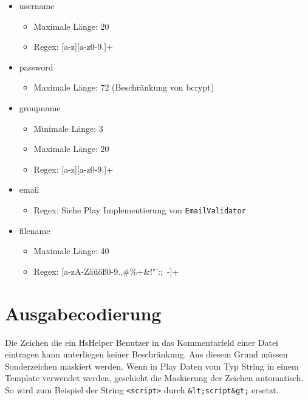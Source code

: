 \documentclass[12pt,DIV14,BCOR10mm,a4paper,parskip=half-,headsepline,headinclude,english,ngerman,bibliography=totocnumbered]{scrreprt}
\begin{document}
\begin{itemize}
	\item username
	 \begin{itemize}
			\item Maximale Länge: 20
			\item Regex: [a-z][a-z0-9.]+
		\end{itemize}


	\item password
	\begin{itemize}
		\item Maximale Länge: 72 (Beschränkung von bcrypt)
	\end{itemize}

	\item groupname
	\begin{itemize}
		\item Minimale Länge: 3
		\item Maximale Länge: 20
		\item Regex: [a-z][a-z0-9.]+

	\end{itemize}


	\item email
	\begin{itemize}
		\item Regex: Siehe Play Implementierung von \texttt{EmailValidator}
	\end{itemize}

	\item filename
	\begin{itemize}
		\item Maximale Länge: 40
		\item Regex: [a-zA-Zäüöß0-9.,\#\%+\&!"':;~-]+
	\end{itemize}

\end{itemize}

\section{Ausgabecodierung}
Die Zeichen die ein HsHelper Benutzer in das Kommentarfeld einer Datei eintragen kann unterliegen keiner Beschränkung. Aus diesem Grund müssen Sonderzeichen maskiert werden. Wenn in Play Daten vom Typ String in einem Template verwendet werden, geschieht die Maskierung der Zeichen automatisch. So wird zum Beispiel der String \texttt{<script>} durch \texttt{\&lt;script\&gt;} ersetzt.

\end{document}
